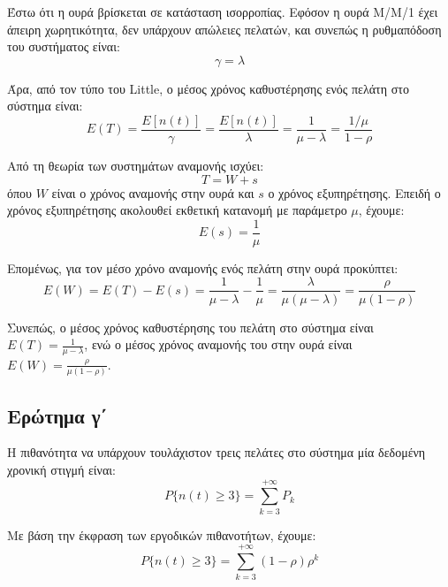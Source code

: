 \documentclass{article}
\begin{document}
Έστω ότι η ουρά βρίσκεται σε κατάσταση ισορροπίας. Εφόσον η ουρά Μ/Μ/1 έχει
άπειρη χωρητικότητα, δεν υπάρχουν απώλειες πελατών, και συνεπώς η
ρυθμαπόδοση του συστήματος είναι:
\begin{equation}
\gamma = \lambda
\end{equation}

Άρα, από τον τύπο του Little, ο μέσος χρόνος καθυστέρησης ενός πελάτη στο
σύστημα είναι:
\begin{equation}
E(T) = \frac{E[n(t)]}{\gamma}
      = \frac{E[n(t)]}{\lambda}
      = \frac{1}{\mu - \lambda}
      = \frac{1/\mu}{1-\rho}
\end{equation}

Από τη θεωρία των συστημάτων αναμονής ισχύει:
\begin{equation}
T = W + s
\end{equation}
όπου $W$ είναι ο χρόνος αναμονής στην ουρά και $s$ ο χρόνος εξυπηρέτησης. Επειδή
ο χρόνος εξυπηρέτησης ακολουθεί εκθετική κατανομή με παράμετρο $\mu$, έχουμε:
\begin{equation}
E(s) = \frac{1}{\mu}
\end{equation}

Επομένως, για τον μέσο χρόνο αναμονής ενός πελάτη στην ουρά προκύπτει:
\begin{equation}
E(W) = E(T) - E(s)
     = \frac{1}{\mu - \lambda} - \frac{1}{\mu}
     = \frac{\lambda}{\mu(\mu - \lambda)}
     = \frac{\rho}{\mu(1-\rho)}
\end{equation}

Συνεπώς, ο μέσος χρόνος καθυστέρησης του πελάτη στο σύστημα είναι
$\displaystyle E(T)=\frac{1}{\mu-\lambda}$, ενώ ο μέσος χρόνος αναμονής του στην
ουρά είναι $\displaystyle E(W)=\frac{\rho}{\mu(1-\rho)}$.

\subsection{Ερώτημα γ΄}

Η πιθανότητα να υπάρχουν τουλάχιστον τρεις πελάτες στο σύστημα μία δεδομένη
χρονική στιγμή είναι:
\begin{equation}
P\{n(t) \geq 3\} = \sum_{k=3}^{+\infty} P_k
\end{equation}

Με βάση την έκφραση των εργοδικών πιθανοτήτων, έχουμε:
\begin{equation}
P\{n(t) \geq 3\} = \sum_{k=3}^{+\infty} (1-\rho)\rho^k
\end{equation}
\end{document}
